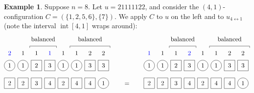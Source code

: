\documentclass[reqno]{amsart}
\newcommand{\0}{\phantom{c}}
\DeclareMathOperator{\inter}{int} %
\theoremstyle{plain}
\theoremstyle{definition}
\newtheorem{example}[thm]{Example}
\numberwithin{equation}{section}
\begin{document}
\begin{example}
Suppose $n = 8$.
Let $u = 21111122$, and consider the $(4,1)$-configuration $C = (\{1,2,5,6\},\{7\})$.
We apply $C$ to $u$ on the left and to $u_{4\leftrightarrow1}$ (note the interval $\inter[4,1]$ wraps around):
\[
\begin{tikzpicture}[baseline=25]
  \def\sc{0.75}   %
  \def\lll{2.7}   %
  \def\ll{2}   %
  \def\l{1}   %
  \node[color=blue] at (1*\sc,\lll) {$2$};
  \node[color=blue] at (4*\sc,\lll) {$1$};
  \foreach \i in {2,3,5,6} { \node at (\i*\sc,\lll){$1$}; }
  \foreach \i in {7,8} { \node at (\i*\sc,\lll){$2$}; }
  \foreach \i in {1,2,5,6} { \draw (\i*\sc,\ll) circle (0.3); }
  \foreach \i in {3,4,7,8} { \draw (\i*\sc-.3,\ll-.3) rectangle +(0.6,+0.6); }
  \foreach \i in {1,2,5,6} { \node at (\i*\sc,\ll) {$1$}; }
  \foreach \i in {3} { \node at (\i*\sc,\ll) {$2$}; }
  \foreach \i in {4,7,8} { \node at (\i*\sc,\ll) {$3$}; }
  \foreach \i in {8} { \draw (\i*\sc,\l) circle (0.3); }
  \foreach \i in {1,2,3,4,5,6,7} { \draw (\i*\sc-.3,\l-.3) rectangle +(0.6,+0.6); }
  \foreach \i in {4,6,7} { \node at (\i*\sc,\l) {$4$}; }
  \foreach \i in {8} { \node at (\i*\sc,\l) {$1$}; }
  \foreach \i in {3} { \node at (\i*\sc,\l) {$3$}; }
  \foreach \i in {1,2,5} { \node at (\i*\sc,\l) {$2$}; }
  \draw (2.5*\sc,3) -- (2.5*\sc,3.1) -- (4.5*\sc,3.1) -- (4.5*\sc,3);
  \node at (3.5*\sc,3.5) {balanced};
  \draw (5.5*\sc,3) -- (5.5*\sc,3.1) -- (8.5*\sc,3.1) -- (8.5*\sc,3);
  \node at (7.0*\sc,3.5) {balanced};
\end{tikzpicture}
\hspace{20pt} = \hspace{20pt}
\begin{tikzpicture}[baseline=25]
  \def\sc{0.75}   %
  \def\lll{2.7}   %
  \def\ll{2}   %
  \def\l{1}   %
  \node[color=blue] at (4*\sc,\lll) {$2$};
  \node[color=blue] at (1*\sc,\lll) {$1$};
  \foreach \i in {2,3,5,6} { \node at (\i*\sc,\lll){$1$}; }
  \foreach \i in {7,8} { \node at (\i*\sc,\lll){$2$}; }
  \foreach \i in {1,2,5,6} { \draw (\i*\sc,\ll) circle (0.3); }
  \foreach \i in {3,4,7,8} { \draw (\i*\sc-.3,\ll-.3) rectangle +(0.6,+0.6); }
  \foreach \i in {1,2,5,6} { \node at (\i*\sc,\ll) {$1$}; }
  \foreach \i in {3} { \node at (\i*\sc,\ll) {$2$}; }
  \foreach \i in {4,7,8} { \node at (\i*\sc,\ll) {$3$}; }
  \foreach \i in {8} { \draw (\i*\sc,\l) circle (0.3); }
  \foreach \i in {1,2,3,4,5,6,7} { \draw (\i*\sc-.3,\l-.3) rectangle +(0.6,+0.6); }
  \foreach \i in {4,6,7} { \node at (\i*\sc,\l) {$4$}; }
  \foreach \i in {8} { \node at (\i*\sc,\l) {$1$}; }
  \foreach \i in {3} { \node at (\i*\sc,\l) {$3$}; }
  \foreach \i in {1,2,5} { \node at (\i*\sc,\l) {$2$}; }
  \draw (2.5*\sc,3) -- (2.5*\sc,3.1) -- (4.5*\sc,3.1) -- (4.5*\sc,3);
  \node at (3.5*\sc,3.5) {balanced};
  \draw (5.5*\sc,3) -- (5.5*\sc,3.1) -- (8.5*\sc,3.1) -- (8.5*\sc,3);
  \node at (7.0*\sc,3.5) {balanced};
\end{tikzpicture}
\]
\end{example}
\end{document}
